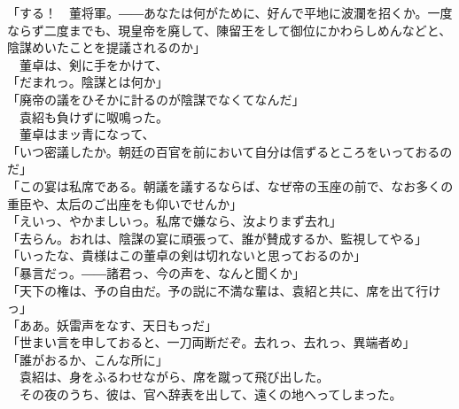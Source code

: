 \documentclass[
  paper=a5,
  fontsize=10pt,
  jafontsize=9.5pt,
  tate,                  %
  open_bracket_pos=nibu, %
]{jlreq}
\begin{document}
「する！　董将軍。――あなたは何がために、好んで平地に波瀾を招くか。一度ならず二度までも、現皇帝を廃して、陳留王をして御位にかわらしめんなどと、陰謀めいたことを提議されるのか」\\


　董卓は、剣に手をかけて、\\


「だまれっ。陰謀とは何か」\\


「廃帝の議をひそかに計るのが陰謀でなくてなんだ」\\


　袁紹も負けずに呶鳴った。\\


　董卓はまッ青になって、\\


「いつ密議したか。朝廷の百官を前において自分は信ずるところをいっておるのだ」\\


「この宴は私席である。朝議を議するならば、なぜ帝の玉座の前で、なお多くの重臣や、太后のご出座をも仰いでせんか」\\


「えいっ、やかましいっ。私席で嫌なら、汝よりまず去れ」\\


「去らん。おれは、陰謀の宴に頑張って、誰が賛成するか、監視してやる」\\


「いったな、貴様はこの董卓の剣は切れないと思っておるのか」\\


「暴言だっ。――諸君っ、今の声を、なんと聞くか」\\


「天下の権は、予の自由だ。予の説に不満な輩は、袁紹と共に、席を出て行けっ」\\


「ああ。妖雷声をなす、天日もっだ」\\


「世まい言を申しておると、一刀両断だぞ。去れっ、去れっ、異端者め」\\


「誰がおるか、こんな所に」\\


　袁紹は、身をふるわせながら、席を蹴って飛び出した。\\


　その夜のうち、彼は、官へ辞表を出して、遠くの地へってしまった。\\
\end{document}
